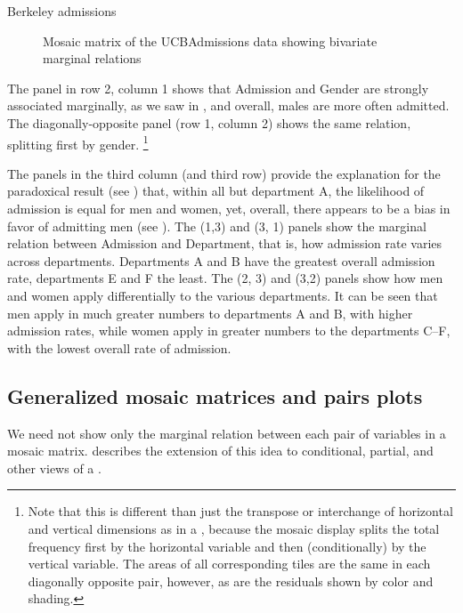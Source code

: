\documentclass[11pt]{book}
\renewenvironment{knitrout}{\small\renewcommand{\baselinestretch}{.85}}{} %
\begin{document}
\begin{Example}[berkeley4]{Berkeley admissions}
\begin{knitrout}
\begin{figure}[!htb]
\caption[Mosaic matrix of the UCBAdmissions data showing bivariate marginal relations]{Mosaic matrix of the UCBAdmissions data showing bivariate marginal relations\label{fig:berk-pairs1}}
\end{figure}


\end{knitrout}
The panel in row 2, column 1
shows that Admission and Gender are
strongly associated marginally, as we saw in ,
and overall, males are more often admitted.
The diagonally-opposite panel (row 1, column 2) shows the
same relation, splitting first by gender.%
\footnote{Note that this is different than just the transpose or interchange
of horizontal and vertical dimensions as in a \scatmat,
because the mosaic display splits the total frequency first by the horizontal
variable and then (conditionally) by the vertical variable.
The areas of all corresponding tiles are the same in each diagonally
opposite pair, however, as are the
residuals shown by color and shading.}

The panels in the third column (and third row)
provide the explanation for the paradoxical
result (see ) that, within all but department A,
the likelihood of admission is equal for men and women,
yet, overall, there appears to be a bias in favor of admitting men
(see ).
The (1,3) and (3, 1) panels show
the marginal relation between Admission and Department, that is, 
how admission rate varies across departments.
Departments A and B have the greatest
overall admission rate, departments E and F the least.
The (2, 3) and (3,2)
panels show how men and women apply differentially to
the various departments.
It can be seen that
men apply in much greater numbers to
departments A and B, with higher admission rates,
while women apply in greater numbers to
the departments C--F, with the lowest overall rate of admission.

\end{Example}

\subsection{Generalized mosaic matrices and pairs plots}\label{sec:condmat}

We need not show only the marginal relation between
each pair of variables in a mosaic matrix.
\citep{Friendly:99:EMD} describes the extension of this idea
to conditional, partial, and other views of a \ctab.
\end{document}
